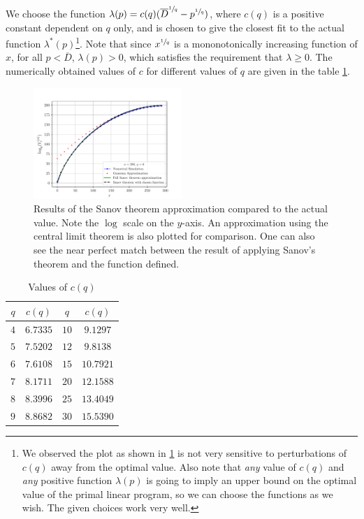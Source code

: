 \documentclass[conference,letterpaper]{IEEEtran}
\begin{document}
We choose the function $\lambda(p) = c(q)(\overline{D}^{\sfrac{1}{q}} - p^{\sfrac{1}{q}})$, where $c(q)$ is a positive constant dependent on $q$ only, and is chosen to give the closest fit to the actual function $\lambda^*(p)$\footnote{We observed the plot as shown in \cref{plot of approximations} is not very sensitive to perturbations of $c(q)$ away from the optimal value. Also note that \textit{any} value of $c(q)$ and \textit{any} positive function $\lambda(p)$ is going to imply an upper bound on the optimal value of the primal linear program, so we can choose the functions as we wish. The given choices work very well.}. Note that since $x^{\sfrac{1}{q}}$ is a mononotonically increasing function of $x$, for all $p < \overline{D}$, $\lambda(p) > 0$, which satisfies the requirement that $\lambda \geq 0$. The numerically obtained values of $c$ for different values of $q$ are given in the table \ref{tab:table_example}. 


\begin{figure}[htbp]
    \centering
    \includegraphics[width=0.5\textwidth]{myimage}
    \caption{Results of the Sanov theorem approximation compared to the actual value. Note the $\log$ scale on the $y$-axis. An approximation using the central limit theorem is also plotted for comparison. One can also see the near perfect match between the result of applying Sanov's theorem and the function defined.}
    \label{plot of approximations}
\end{figure}
\vspace*{-\baselineskip}
\begin{table}[htbp]
   \renewcommand{\arraystretch}{1.3}
   \caption{Values of $c(q)$}
   \label{tab:table_example}
   \centering
   \begin{tabular}{|c|c|c|c|}
     \hline
     $q$ & $c(q)$ & $q$ & $c(q)$\\
     \hline
     $4$ & $6.7335$ & $10$ & $9.1297$\\
     \hline
     $5$ & $7.5202$ & $12$ & $9.8138$\\
     \hline
     $6$ & $7.6108$ & $15$ & $10.7921$\\
     \hline
     $7$ & $8.1711$ & $20$ & $12.1588$\\
     \hline
     $8$ & $8.3996$ & $25$ & $13.4049$\\
     \hline
     $9$ & $8.8682$ & $30$ & $15.5390$\\
     \hline
   \end{tabular}
\end{table}
\end{document}
